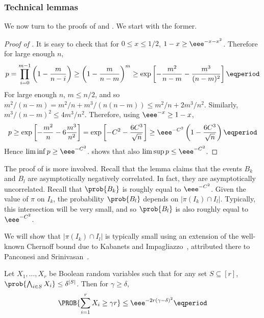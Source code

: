 \subsubsection{Technical lemmas}

We now turn to the proofs of  and . We start with the former.

\begin{proof}[Proof of ]
 It is easy to check that for $0 \leq x \leq 1/2$, $1-x \geq \eee^{-x-x^2}$. Therefore for large enough $n$,
\begin{equation}
 p = \prod_{i=0}^{m-1} \left(1 - \frac{m}{n-i}\right) \geq
 \left(1 - \frac{m}{n-m}\right)^m \geq
 \exp \left[ -\frac{m^2}{n-m}-\frac{m^3}{(n-m)^2} \right] \eqperiod
\end{equation}
 For large enough $n$, $m \leq n/2$, and so $m^2/(n-m) = m^2/n + m^3/(n(n-m)) \leq m^2/n + 2m^3/n^2$. Similarly, $m^3/(n-m)^2 \leq 4m^3/n^2$. Therefore, using $\eee^{-x} \geq 1-x$,
\begin{equation}
 p \geq \exp \left[ -\frac{m^2}{n} - 6\frac{m^3}{n^2} \right] = \exp \left[ -C^2 -\frac{6C^3}{\sqrt{n}} \right] \geq \eee^{-C^2} \left(1 - \frac{6C^3}{\sqrt{n}}\right) \eqperiod
\end{equation}
 Hence $\liminf p \geq \eee^{-C^2}$.  shows that also $\limsup p \leq \eee^{-C^2}$.
\end{proof}

The proof of  is more involved. Recall that the lemma claims that the events $B_k$ and $B_l$ are asymptotically negatively correlated. In fact, they are asymptotically uncorrelated. Recall that $\prob{B_k}$ is roughly equal to $\eee^{-C^2}$. Given the value of $\pi$ on $I_k$, the probability $\prob{B_l}$ depends on $|\pi(I_k) \cap I_l|$. Typically, this intersection will be very small, and so $\prob{B_l}$ is also roughly equal to $\eee^{-C^2}$.

%
%
%

We will show that $|\pi(I_k) \cap I_l|$ is typically small using an
  extension of the well-known Chernoff bound due to Kabanets and
  Impagliazzo~\cite[Theorem 1.1]{KI}, attributed there to Panconesi and
  Srinivasan~\cite{PS}.


\begin{theorem} \label{thm:chernoff}
 Let $X_1,\ldots,X_r$ be Boolean random variables such that for any set $S \subseteq [r]$, $\prob{\bigwedge_{i \in S} X_i} \leq \delta^{|S|}$. Then for $\gamma \geq \delta$,
\begin{equation*}
 \PROB{\sum_{i=1}^r X_i \geq \gamma r} \leq \eee^{-2r(\gamma - \delta)^2} \eqperiod
\end{equation*}
\end{theorem}

